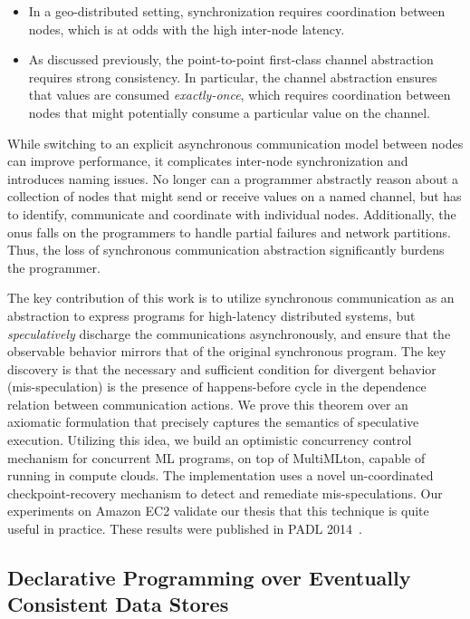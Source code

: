 \begin{itemize}
\item In a geo-distributed setting, synchronization requires coordination
between nodes, which is at odds with the high inter-node latency.
\item As discussed previously, the point-to-point first-class channel
abstraction requires strong consistency. In particular, the channel abstraction
ensures that values are consumed \emph{exactly-once}, which requires
coordination between nodes that might potentially consume a particular value on
the channel.
\end{itemize}

While switching to an explicit asynchronous communication model between nodes
can improve performance, it complicates inter-node synchronization and
introduces naming issues. No longer can a programmer abstractly reason about a
collection of nodes that might send or receive values on a named channel, but
has to identify, communicate and coordinate with individual nodes.
Additionally, the onus falls on the programmers to handle partial failures and
network partitions. Thus, the loss of synchronous communication abstraction
significantly burdens the programmer.

The key contribution of this work is to utilize synchronous communication as an
abstraction to express programs for high-latency distributed systems, but
\emph{speculatively} discharge the communications asynchronously, and ensure
that the observable behavior mirrors that of the original synchronous program.
The key discovery is that the necessary and sufficient condition for divergent
behavior (mis-speculation) is the presence of happens-before cycle in the
dependence relation between communication actions. We prove this theorem over
an axiomatic formulation that precisely captures the semantics of speculative
execution. Utilizing this idea, we build an optimistic concurrency control
mechanism for concurrent ML programs, on top of MultiMLton, capable of running
in compute clouds. The implementation uses a novel un-coordinated
checkpoint-recovery mechanism to detect and remediate mis-speculations. Our
experiments on Amazon EC2 validate our thesis that this technique is quite
useful in practice. These results were published in PADL 2014~\cite{rxcml}.

\subsection{Declarative Programming over Eventually Consistent Data Stores}

